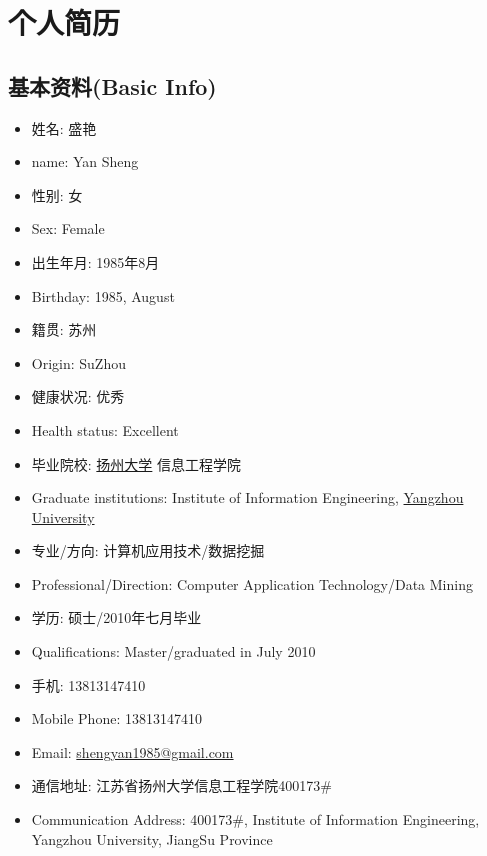 \documentclass[a4paper,10pt,english]{manual}
\begin{document}

\chapter{个人简历}
\section{基本资料(Basic Info)}
\begin{itemize}
\item {} 
姓名: 盛艳

\item {} 
name: Yan Sheng

\item {} 
性别: 女

\item {} 
Sex: Female

\item {} 
出生年月: 1985年8月

\item {} 
Birthday: 1985, August

\item {} 
籍贯: 苏州

\item {} 
Origin: SuZhou

\item {} 
健康状况: 优秀

\item {} 
Health status: Excellent

\item {} 
毕业院校: \href{http://www.yzu.edu.cn}{扬州大学} 信息工程学院

\item {} 
Graduate institutions: Institute of Information Engineering, \href{http://www.yzu.edu.cn}{Yangzhou University}

\item {} 
专业/方向: 计算机应用技术/数据挖掘

\item {} 
Professional/Direction: Computer Application Technology/Data Mining

\item {} 
学历: 硕士/2010年七月毕业

\item {} 
Qualifications: Master/graduated in July 2010

\item {} 
手机: 13813147410

\item {} 
Mobile Phone: 13813147410

\item {} 
Email: \href{mailto:shengyan1985@gmail.com}{shengyan1985@gmail.com}

\item {} 
通信地址: 江苏省扬州大学信息工程学院400173\#

\item {} 
Communication Address: 400173\#, Institute of Information Engineering, Yangzhou University, JiangSu Province

\end{itemize}
\end{document}
